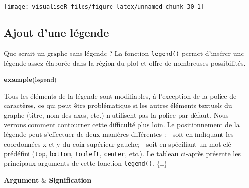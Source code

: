 \documentclass[]{article}
\newenvironment{Shaded}{\begin{snugshade}}{\end{snugshade}}
\newcommand{\KeywordTok}[1]{\textcolor[rgb]{0.13,0.29,0.53}{\textbf{#1}}}
\newcommand{\NormalTok}[1]{#1}
\begin{document}
\begin{center}\texttt{[image: visualiseR\_files/figure-latex/unnamed-chunk-30-1]} \end{center}

\hypertarget{ajout-dune-luxe9gende}{%
\subsection{Ajout d'une légende}\label{ajout-dune-luxe9gende}}

Que serait un graphe sans légende ? La fonction \texttt{legend()} permet d'insérer une légende assez élaborée dans la région du plot et offre de nombreuses possibilités.

\begin{Shaded}
\begin{Highlighting}[]
\KeywordTok{example}\NormalTok{(legend)}
\end{Highlighting}
\end{Shaded}

Tous les éléments de la légende sont modifiables, à l'exception de la police de caractères, ce qui peut être problématique si les autres éléments textuels du graphe (titre, nom des axes, etc.) n'utilisent pas la police par défaut. Nous verrons comment contourner cette difficulté plus loin.
Le positionnement de la légende peut s'effectuer de deux manières différentes :
- soit en indiquant les coordonnées x et y du coin supérieur gauche;
- soit en spécifiant un mot-clé prédéfini (\texttt{top}, \texttt{bottom}, \texttt{topleft}, \texttt{center}, etc.).
Le tableau ci-après présente les principaux arguments de cette fonction \texttt{legend()}.
\{ll\}

\textbf{Argument} \& \textbf{Signification}
\end{document}

